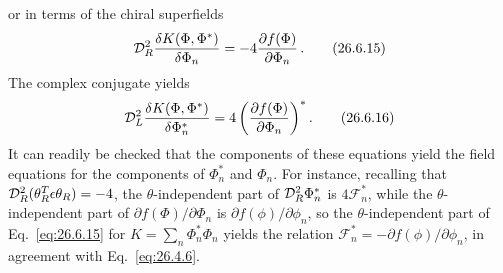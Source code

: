or in terms of the chiral superfields
\begin{equation}
  \mathcal{D}_R^2
  \frac{\delta K(\Phi,\Phi^*)}{\delta\Phi_n}
  =-4\frac{\partial f(\Phi)}{\partial\Phi_n}\,.
  \tag{26.6.15}\label{eq:26.6.15}
\end{equation}
The complex conjugate yields
\begin{equation}
  \mathcal{D}_L^2
  \frac{\delta K(\Phi,\Phi^*)}{\delta\Phi_n^*}
  =4\left(\frac{\partial f(\Phi)}{\partial\Phi_n}\right)^* .
  \tag{26.6.16}\label{eq:26.6.16}
\end{equation}
It can readily be checked that the components of these equations yield the
field equations for the components of \(\Phi_n^*\) and \(\Phi_n\). For
instance, recalling that
\(\mathcal{D}_R^2(\theta_R^T\epsilon\theta_R)=-4\), the
\(\theta\)-independent part of \(\mathcal{D}_R^2\Phi_n^*\) is
\(4\mathcal{F}_n^*\), while the \(\theta\)-independent part of
\(\partial f(\Phi)/\partial\Phi_n\) is
\(\partial f(\phi)/\partial\phi_n\), so the \(\theta\)-independent part of
Eq.~\eqref{eq:26.6.15} for \(K=\sum_n\Phi_n^*\Phi_n\) yields the relation
\(\mathcal{F}_n^*=-\partial f(\phi)/\partial\phi_n\), in agreement with
Eq.~\eqref{eq:26.4.6}.

